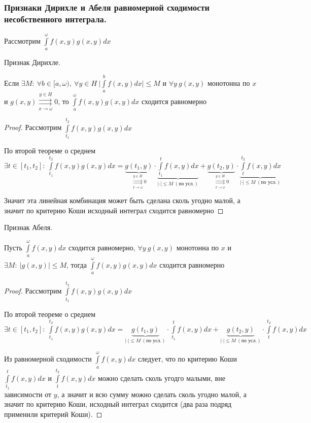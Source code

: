 \subsubsection{Признаки Дирихле и Абеля равномерной сходимости несобственного интеграла.}
Рассмотрим $\int\limits_a^\omega f(x,y)g(x,y)dx$
\begin{theorem*} 
    Признак Дирихле.
    
    Если $\exists M\colon\ \forall b\in[a,\omega),\ \forall y\in H\ \Big|\int\limits_a^bf(x,y)dx\Big|\leqslant M$ и $\forall y\ g(x,y)$ монотонна по $x$ и $g(x,y)\overset{y\in H}{\underset{x\to\omega}{\rightrightarrows}}0$, то 
        $\int\limits_a^\omega f(x,y)g(x,y)dx$ сходится равномерно
\end{theorem*}
\begin{proof} 
    Рассмотрим $\int\limits_{t_1}^{t_2} f(x,y)g(x,y)dx$ 
    
    По второй теореме о среднем $\exists t\in [t_1,t_2]\colon\  \int\limits_{t_1}^{t_2} f(x,y)g(x,y)dx=\underbrace{g(t_1,y)}_{\overset{y\in H}{\underset{x\to\omega}{\rightrightarrows}}0}\cdot \underbrace{\int\limits_{t_1}^{t} f(x,y)dx}_{|\cdot|\leqslant M\ (\text{по усл.})} + \underbrace{g(t_2, y)}_{\overset{y\in H}{\underset{x\to\omega}{\rightrightarrows}}0}\cdot\underbrace{\int\limits_t^{t_2} f(x,y)dx}_{|\cdot|\leqslant M\ (\text{по усл.})}$
    
    Значит эта линейная комбинация может быть сделана сколь угодно малой, а значит по критерию Коши исходный интеграл сходится равномерно
\end{proof}

\begin{theorem*} 
    Признак Абеля.
    
    Пусть $\int\limits_a^\omega f(x,y)dx$ сходится равномерно, $\forall y\ g(x,y)$ монотонна по $x$ и $\exists M\colon\ |g(x,y)|\leqslant M$, тогда 
        $\int\limits_a^\omega f(x,y)g(x,y)dx$ сходится равномерно
\end{theorem*}
\begin{proof}
    Рассмотрим $\int\limits_{t_1}^{t_2} f(x,y)g(x,y)dx$
    
    По второй теореме о среднем $\exists t\in [t_1,t_2]\colon\  \int\limits_{t_1}^{t_2} f(x,y)g(x,y)dx=\underbrace{g(t_1,y)}_{|\cdot|\leqslant M\ (\text{по усл.})}\cdot \int\limits_{t_1}^{t} f(x,y)dx + \underbrace{g(t_2, y)}_{|\cdot|\leqslant M\ (\text{по усл.})}\cdot\int\limits_t^{t_2} f(x,y)dx$
    
    Из равномерной сходимости $\int\limits_a^\omega f(x,y)dx$ следует, что по критерию Коши $\int\limits_{t_1}^{t} f(x,y)dx$ и $\int\limits_t^{t_2} f(x,y)dx$ можно сделать сколь угодго малыми, вне зависимости от $y$, а значит и всю сумму можно сделать сколь угодно малой, а значит по критерию Коши, исходный интеграл сходится (два раза подряд применили критерий Коши).
\end{proof}
